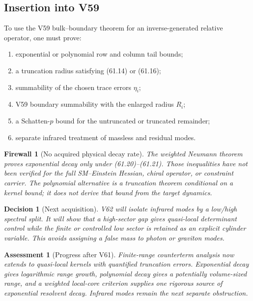 \documentclass[11pt]{article}
\newtheorem{assessment}[theorem]{Assessment}
\newtheorem{firewall}[theorem]{Firewall}
\newtheorem{decision}[theorem]{Decision}
\begin{document}
\subsection{Insertion into V59}

\begin{ledger}
\label{led:v11v61-data}
To use the V59 bulk--boundary theorem for an inverse-generated
relative operator, one must prove:
\begin{enumerate}
\item exponential or polynomial row and column tail bounds;
\item a truncation radius satisfying (61.14) or (61.16);
\item summability of the chosen trace errors \(\eta_i\);
\item V59 boundary summability with the enlarged radius \(R_i\);
\item a Schatten-\(p\) bound for the untruncated or truncated remainder;
\item separate infrared treatment of massless and residual modes.
\end{enumerate}
\end{ledger}

\begin{firewall}[No acquired physical decay rate]
\label{fire:v11v61-boundary}
The weighted Neumann theorem proves exponential decay only under
(61.20)--(61.21).  Those inequalities have not been verified for the
full SM--Einstein Hessian, chiral operator, or constraint carrier.
The polynomial alternative is a truncation theorem conditional on a
kernel bound; it does not derive that bound from the target dynamics.
\end{firewall}

\begin{decision}[Next acquisition]
\label{dec:v11v61-next}
V62 will isolate infrared modes by a low/high spectral split.  It will
show that a high-sector gap gives quasi-local determinant control while
the finite or controlled low sector is retained as an explicit
cylinder variable.  This avoids assigning a false mass to photon or
graviton modes.
\end{decision}

\begin{assessment}[Progress after V61]
\label{ass:v11v61-status}
Finite-range counterterm analysis now extends to quasi-local kernels
with quantified truncation errors.  Exponential decay gives logarithmic
range growth, polynomial decay gives a potentially volume-sized range,
and a weighted local-core criterion supplies one rigorous source of
exponential resolvent decay.  Infrared modes remain the next separate
obstruction.
\end{assessment}
\end{document}
